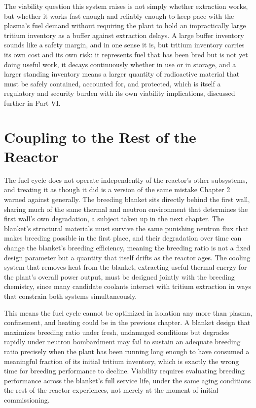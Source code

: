 The viability question this system raises is not simply whether extraction works, but whether it works fast enough and reliably enough to keep pace with the plasma's fuel demand without requiring the plant to hold an impractically large tritium inventory as a buffer against extraction delays. A large buffer inventory sounds like a safety margin, and in one sense it is, but tritium inventory carries its own cost and its own risk: it represents fuel that has been bred but is not yet doing useful work, it decays continuously whether in use or in storage, and a larger standing inventory means a larger quantity of radioactive material that must be safely contained, accounted for, and protected, which is itself a regulatory and security burden with its own viability implications, discussed further in Part VI.

\section{Coupling to the Rest of the Reactor}

The fuel cycle does not operate independently of the reactor's other subsystems, and treating it as though it did is a version of the same mistake Chapter 2 warned against generally. The breeding blanket sits directly behind the first wall, sharing much of the same thermal and neutron environment that determines the first wall's own degradation, a subject taken up in the next chapter. The blanket's structural materials must survive the same punishing neutron flux that makes breeding possible in the first place, and their degradation over time can change the blanket's breeding efficiency, meaning the breeding ratio is not a fixed design parameter but a quantity that itself drifts as the reactor ages. The cooling system that removes heat from the blanket, extracting useful thermal energy for the plant's overall power output, must be designed jointly with the breeding chemistry, since many candidate coolants interact with tritium extraction in ways that constrain both systems simultaneously.

This means the fuel cycle cannot be optimized in isolation any more than plasma, confinement, and heating could be in the previous chapter. A blanket design that maximizes breeding ratio under fresh, undamaged conditions but degrades rapidly under neutron bombardment may fail to sustain an adequate breeding ratio precisely when the plant has been running long enough to have consumed a meaningful fraction of its initial tritium inventory, which is exactly the wrong time for breeding performance to decline. Viability requires evaluating breeding performance across the blanket's full service life, under the same aging conditions the rest of the reactor experiences, not merely at the moment of initial commissioning.

